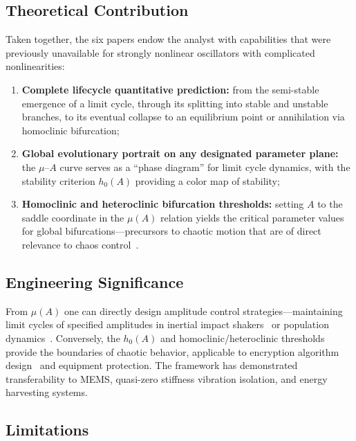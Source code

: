 \documentclass[11pt,a4paper]{article}
\begin{document}
\subsection{Theoretical Contribution}

Taken together, the six papers endow the analyst with capabilities that were previously unavailable for strongly nonlinear oscillators with complicated nonlinearities:

\begin{enumerate}[leftmargin=2em]
\item \textbf{Complete lifecycle quantitative prediction:} from the semi-stable emergence of a limit cycle, through its splitting into stable and unstable branches, to its eventual collapse to an equilibrium point or annihilation via homoclinic bifurcation;

\item \textbf{Global evolutionary portrait on any designated parameter plane:} the $\mu$--$A$ curve serves as a ``phase diagram'' for limit cycle dynamics, with the stability criterion $h_0(A)$ providing a color map of stability;

\item \textbf{Homoclinic and heteroclinic bifurcation thresholds:} setting $A$ to the saddle coordinate in the $\mu(A)$ relation yields the critical parameter values for global bifurcations---precursors to chaotic motion that are of direct relevance to chaos control~\cite{Wiggins2003}.
\end{enumerate}

\subsection{Engineering Significance}

From $\mu(A)$ one can directly design amplitude control strategies---maintaining limit cycles of specified amplitudes in inertial impact shakers~\cite{Babitsky2011} or population dynamics~\cite{Murray2002}. Conversely, the $h_0(A)$ and homoclinic/heteroclinic thresholds provide the boundaries of chaotic behavior, applicable to encryption algorithm design~\cite{Strogatz2018} and equipment protection. The framework has demonstrated transferability to MEMS, quasi-zero stiffness vibration isolation, and energy harvesting systems.

\subsection{Limitations}
\end{document}
